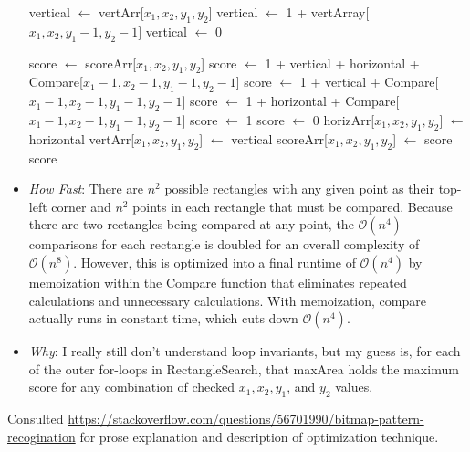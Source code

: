 \documentclass{article}
\begin{document}
\begin{itemize}
\begin{algorithm}
\begin{algorithmic}
\State vertical $\leftarrow$ vertArr[$x_1, x_2, y_1, y_2$]
\State vertical $\leftarrow$ 1 + vertArray[$x_1, x_2, y_1 - 1, y_2 -1]$
\Else
\State vertical $\leftarrow$ 0
\EndIf

\State score $\leftarrow$ scoreArr[$x_1, x_2, y_1, y_2$]
\State score $\leftarrow$ 1 + vertical + horizontal + Compare[$x_1 -1, x_2 -1, y_1 -1, y_2 -1$]
\State score $\leftarrow$ 1 + vertical + Compare[$x_1 -1, x_2 -1, y_1 -1, y_2 -1$]
\State score $\leftarrow$ 1 + horizontal + Compare[$x_1 - 1, x_2 - 1, y_1 - 1, y_2 -1$]
\State score $\leftarrow$ 1
\Else
\State score $\leftarrow$ 0
\EndIf
\State horizArr[$x_1, x_2, y_1, y_2$] $\leftarrow$ horizontal
\State vertArr[$x_1, x_2, y_1, y_2$] $\leftarrow$ vertical
\State scoreArr[$x_1, x_2, y_1, y_2$] $\leftarrow$ score
\State \Return score
\EndFunction
\end{algorithmic}
\end{algorithm}

            \item \emph{How Fast}: There are $n^2$ possible rectangles with any given point as their top-left corner and $n^2$ points in each rectangle that must be compared. Because there are two rectangles being compared at any point, the $\mathcal{O}(n^4)$ comparisons for each rectangle is doubled for an overall complexity of $\mathcal{O}(n^8).$ However, this is optimized into a final runtime of $\mathcal{O}(n^4)$ by memoization within the Compare function that eliminates repeated calculations and unnecessary calculations. With memoization, compare actually runs in constant time, which cuts down $\mathcal{O}(n^4)$.  

            \item \emph{Why}: I really still don't understand loop invariants, but my guess is, for each of the outer for-loops in RectangleSearch, that maxArea holds the maximum score for any combination of checked $x_1, x_2, y_1$, and $y_2$ values. 
        \end{itemize}

Consulted \url{https://stackoverflow.com/questions/56701990/bitmap-pattern-recogination} for prose explanation and description of optimization technique.
\end{document}
